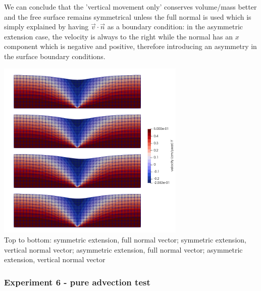 We can conclude that the 'vertical movement only' conserves volume/mass better and the free surface remains symmetrical unless the full normal is used which is simply explained by having $\vec{v}\cdot\vec{n}$ as a boundary condition: in the asymmetric extension case, the velocity is always to the right while the normal has an $x$ component which is negative and positive, therefore introducing an asymmetry in the surface boundary conditions.

\begin{center}
\includegraphics[width=9cm]{python_codes/fieldstone_54/images/exp4-5/v}\\
{\scriptsize Top to bottom: 
symmetric extension, full normal vector; 
symmetric extension, vertical normal vector; 
asymmetric extension, full normal vector; 
asymmetric extension, vertical normal vector}
\end{center}

\subsubsection*{Experiment 6 - pure advection test}

